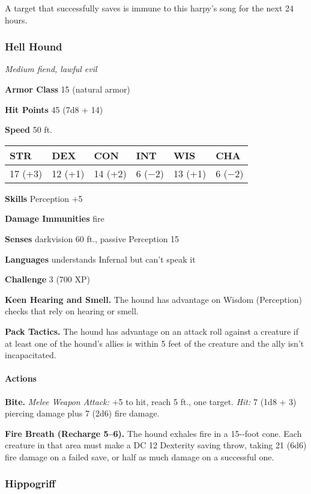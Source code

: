 \documentclass[
]{article}
\begin{document}
A target that successfully saves is immune to this harpy's song for the
next 24 hours.

\hypertarget{hell-hound}{%
\subsubsection{Hell Hound}\label{hell-hound}}

\emph{Medium fiend, lawful evil}

\textbf{Armor Class} 15 (natural armor)

\textbf{Hit Points} 45 (7d8 + 14)

\textbf{Speed} 50 ft.

\begin{longtable}[]{@{}llllll@{}}
\toprule
STR & DEX & CON & INT & WIS & CHA\tabularnewline
\midrule
\endhead
17 (+3) & 12 (+1) & 14 (+2) & 6 (−2) & 13 (+1) & 6 (−2)\tabularnewline
\bottomrule
\end{longtable}

\textbf{Skills} Perception +5

\textbf{Damage Immunities} fire

\textbf{Senses} darkvision 60 ft., passive Perception 15

\textbf{Languages} understands Infernal but can't speak it

\textbf{Challenge} 3 (700 XP)

\textbf{Keen Hearing and Smell.} The hound has advantage on Wisdom
(Perception) checks that rely on hearing or smell.

\textbf{Pack Tactics.} The hound has advantage on an attack roll against
a creature if at least one of the hound's allies is within 5 feet of the
creature and the ally isn't incapacitated.

\hypertarget{actions-5}{%
\paragraph{Actions}\label{actions-5}}

\textbf{Bite.} \emph{Melee Weapon Attack:} +5 to hit, reach 5 ft., one
target. \emph{Hit:} 7 (1d8 + 3) piercing damage plus 7 (2d6) fire
damage.

\textbf{Fire Breath (Recharge 5--6).} The hound exhales fire in a
15-­‐foot cone. Each creature in that area must make a DC 12 Dexterity
saving throw, taking 21 (6d6) fire damage on a failed save, or half as
much damage on a successful one.

\hypertarget{hippogriff}{%
\subsubsection{Hippogriff}\label{hippogriff}}
\end{document}
